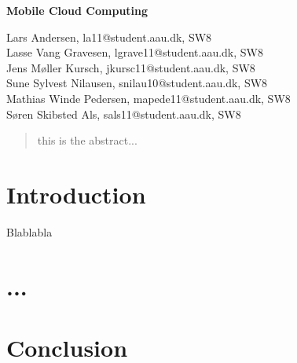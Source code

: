 \documentclass[12pt,a4paper]{article}
\begin{document}
\begin{center}
\bigskip\bigskip
{\Large\bf Mobile Cloud Computing}
\bigskip\bigskip


Lars Andersen, la11@student.aau.dk, SW8\\
Lasse Vang Gravesen, lgrave11@student.aau.dk, SW8\\
Jens Møller Kursch, jkursc11@student.aau.dk, SW8\\
Sune Sylvest Nilausen, snilau10@student.aau.dk, SW8\\
Mathias Winde Pedersen, mapede11@student.aau.dk, SW8\\
Søren Skibsted Als, sals11@student.aau.dk, SW8 %

\bigskip
\begin{abstract}
this is the abstract...
\end{abstract}

\thispagestyle{empty}
\end{center}


\titlepage

\thispagestyle{plain}


\section{Introduction}
Blablabla \citep{misc:mobilecloudcomputing}

\section{...}



\section{Conclusion}




\label{bib:mybiblio}
\end{document}
